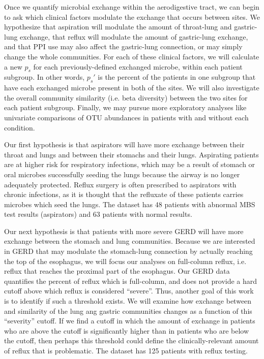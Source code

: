 \documentclass[12pt]{article}
\begin{document}
Once we quantify microbial exchange within the aerodigestive tract, we 
can begin to ask which clinical factors modulate the exchange 
that occurs between sites. We hypothesize that aspiration will modulate the 
amount of throat-lung and gastric-lung exchange, that reflux will modulate 
the amount of gastric-lung exchange, and that PPI use may also affect
the gastric-lung connection, or may simply change the whole communities.
For each of these clinical factors, we will calculate a new $p_s$ for 
each previously-defined exchanged microbe, within each patient subgroup.
In other words, $p_s'$ is the percent of the patients in one subgroup
that have each exchanged microbe present in both of the sites.
We will also investigate the overall community similarity (i.e. beta diversity) 
between the two sites for each patient subgroup. Finally, we may pursue
more exploratory analyses like univariate comparisons of OTU abundances
in patients with and without each condition.


Our first hypothesis is that aspirators will have more exchange between their throat and lungs and between their stomachs and their lungs.
Aspirating patients are at higher risk for respiratory infections, which
may be a result of stomach or oral microbes successfully seeding the lungs
because the airway is no longer adequately protected.
Reflux surgery is often prescribed to aspirators with chronic infections,
as it is thought that the refluxate of these patients carries microbes which seed the lungs. 
The dataset has 48 patients with abnormal MBS test results (aspirators) and 63 patients with normal results.

Our next hypothesis is that patients with more severe GERD will have 
more exchange between the stomach and lung communities. Because we are 
interested in GERD that may modulate the stomach-lung connection by
actually reaching the top of the esophagus, we will focus our analyses
on full-column reflux, i.e. reflux that reaches the proximal part of the esophagus.
Our GERD data quantifies the
percent of reflux which is full-column, and does not provide a hard
cutoff above which reflux is considered ``severe''. Thus, another goal
of this work is to identify if such a threshold exists. We will examine
how exchange between and similarity of the lung ang gastric communities
changes as a function of this ``severity'' cutoff. If we find a cutoff
in which the amount of exchange in patients who are above the cutoff is 
significantly higher than in patients who are below the cutoff, then perhaps
this threshold could define the clinically-relevant amount of reflux that is
problematic. The dataset has 125 patients with reflux testing.
\end{document}
